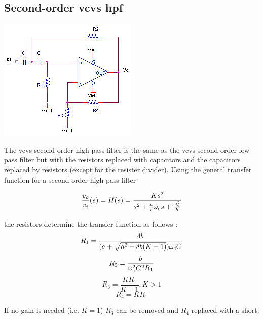 \subsection{Second-order \acs{vcvs} \acl{hpf}}
\begin{center}
	\includegraphics{schematics/2ndorder_vcvs_HPfilter.PNG}
\end{center}
The \ac{vcvs} second-order high pass filter is the same as the \ac{vcvs} second-order low pass filter but with the resistors replaced with capacitors and the capacitors replaced by resistors (except for the resister divider). Using the  general transfer function for a second-order high pass filter

\textcolor{red}{
\begin{equation}
\frac{\vout}{\vin}(s) = \Hs = \frac{Ks^2}{s^2 + \frac{a}{b}\wcutoff s + \frac{\wcutoff^2}{b}}
\label{eq:2ndorder_vcvs_HPfilter}
\end{equation}
}

the resistors determine the transfer function as follows \autocite[130-131]{op-amp-circuits-johnson}:
\begin{equation}
R_1 = \frac{4b}{(a+\sqrt{a^2 + 8b(K-1)})\omega_\mathrm{c} C}
\end{equation}
\begin{equation}
R_2 = \frac{b}{\omega_\mathrm{c}^2 C^2 R_1}
\end{equation}
\begin{equation}
R_3 = \frac{K R_1}{K-1}, K > 1
\end{equation}
\begin{equation}
R_4 = K R_1
\end{equation}

If no gain is needed (i.e. $K = 1$) $R_3$ can be removed and $R_4$ replaced with a short.

